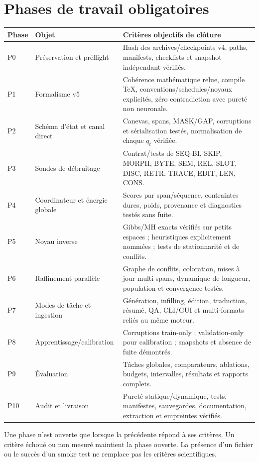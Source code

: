 \documentclass[11pt,a4paper,oneside]{report}
\begin{document}
\chapter{Phases de travail obligatoires}
\begin{longtable}{p{1.2cm}p{3.0cm}p{8.8cm}}
\toprule Phase & Objet & Critères objectifs de clôture\\
\midrule
P0 & Préservation et préflight & Hash des archives/checkpoints v4, paths, manifests, checklists et snapshot indépendant vérifiés.\\
P1 & Formalisme v5 & Cohérence mathématique relue, compile TeX, conventions/schedules/noyaux explicités, zéro contradiction avec pureté non neuronale.\\
P2 & Schéma d'état et canal direct & Canevas, spans, MASK/GAP, corruptions et sérialisation testés, normalisation de chaque $q_t$ vérifiée.\\
P3 & Sondes de débruitage & Contrat/tests de SEQ-BI, SKIP, MORPH, BYTE, SEM, REL, SLOT, DISC, RETR, TRACE, EDIT, LEN, CONS.\\
P4 & Coordinateur et énergie globale & Scores par span/séquence, contraintes dures, poids, provenance et diagnostics testés sans fuite.\\
P5 & Noyau inverse & Gibbs/MH exacts vérifiés sur petits espaces ; heuristiques explicitement nommées ; tests de stationnarité et de conflits.\\
P6 & Raffinement parallèle & Graphe de conflits, coloration, mises à jour multi-spans, dynamique de longueur, population et convergence testés.\\
P7 & Modes de tâche et ingestion & Génération, infilling, édition, traduction, résumé, QA, CLI/GUI et multi-formats reliés au même moteur.\\
P8 & Apprentissage/\newline calibration & Corruptions train-only ; validation-only pour calibration ; snapshots et absence de fuite démontrés.\\
P9 & Évaluation & Tâches globales, comparateurs, ablations, budgets, intervalles, résultats et rapports complets.\\
P10 & Audit et livraison & Pureté statique/dynamique, tests, manifestes, sauvegardes, documentation, extraction et empreintes vérifiés.\\
\bottomrule
\end{longtable}
Une phase n'est ouverte que lorsque la précédente répond à ses critères. Un critère échoué ou non mesuré maintient la phase ouverte. La présence d'un fichier ou le succès d'un smoke test ne remplace pas les critères scientifiques.
\end{document}
